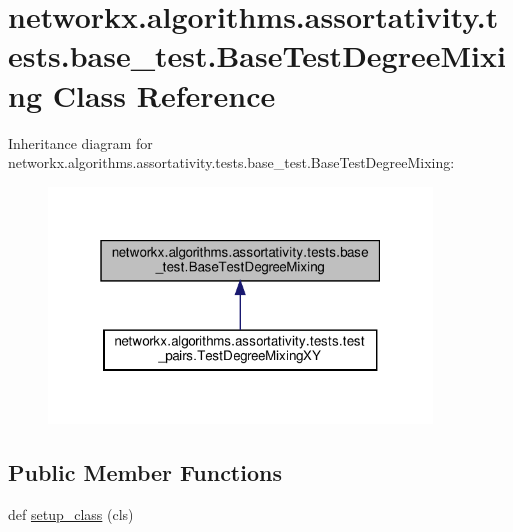 \hypertarget{classnetworkx_1_1algorithms_1_1assortativity_1_1tests_1_1base__test_1_1BaseTestDegreeMixing}{}\section{networkx.\+algorithms.\+assortativity.\+tests.\+base\+\_\+test.\+Base\+Test\+Degree\+Mixing Class Reference}
\label{classnetworkx_1_1algorithms_1_1assortativity_1_1tests_1_1base__test_1_1BaseTestDegreeMixing}


Inheritance diagram for networkx.\+algorithms.\+assortativity.\+tests.\+base\+\_\+test.\+Base\+Test\+Degree\+Mixing\+:
\nopagebreak
\begin{figure}[H]
\begin{center}
\leavevmode
\includegraphics[width=289pt]{classnetworkx_1_1algorithms_1_1assortativity_1_1tests_1_1base__test_1_1BaseTestDegreeMixing__inherit__graph}
\end{center}
\end{figure}
\subsection*{Public Member Functions}
\begin{DoxyCompactItemize}
\item 
def \hyperlink{classnetworkx_1_1algorithms_1_1assortativity_1_1tests_1_1base__test_1_1BaseTestDegreeMixing_a06821c6eb723ee9ee79314e3fa452a75}{setup\+\_\+class} (cls)
\end{DoxyCompactItemize}
